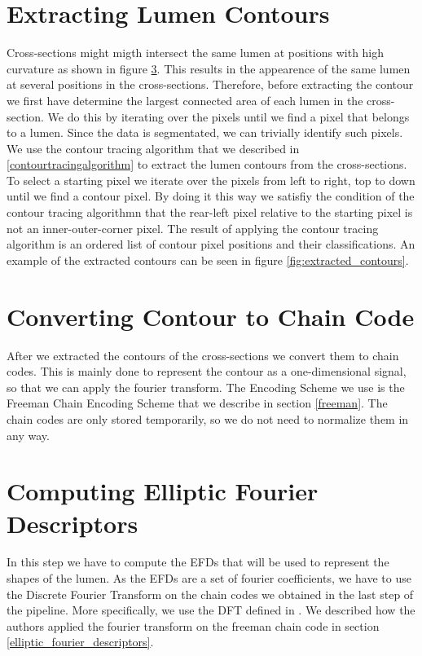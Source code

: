 \documentclass[thesis.tex]{subfiles}
\begin{document}
\section{Extracting Lumen Contours}
Cross-sections might migth intersect the same lumen at positions with high curvature as shown in figure \ref{}. This results in the appearence of the same lumen at several positions in the cross-sections. Therefore, before extracting the contour we first have determine the largest connected area of each lumen in the cross-section. We do this by iterating over the pixels until we find a pixel that belongs to a lumen. Since the data is segmentated, we can trivially identify such pixels. \\   

We use the contour tracing algorithm that we described in \ref{contourtracingalgorithm} to extract the lumen contours from the cross-sections. To select a starting pixel we iterate over the pixels from left to right, top to down until we find a contour pixel. By doing it this way we satisfiy the condition of the contour tracing algorithmn that the rear-left pixel relative to the starting pixel is not an inner-outer-corner pixel.
The result of applying the contour tracing algorithm is an ordered list of contour pixel positions and their classifications.
An example of the extracted contours can be seen in figure \ref{fig:extracted_contours}.

\section{Converting Contour to Chain Code}
After we extracted the contours of the cross-sections we convert them to chain codes. This is mainly done to represent the contour as a one-dimensional signal, so that we can apply the fourier transform. The Encoding Scheme we use is the Freeman Chain Encoding Scheme that we describe in section \ref{freeman}. The chain codes are only stored temporarily, so we do not need to normalize them in any way.

\section{Computing Elliptic Fourier Descriptors}
In this step we have to compute the EFDs that will be used to represent the shapes of the lumen. As the EFDs are a set of fourier coefficients, we have to use the Discrete Fourier Transform on the chain codes we obtained in the last step of the pipeline. More specifically, we use the DFT defined in \cite{giardinia}. We described how the authors applied the fourier transform on the freeman chain code in section \ref{elliptic_fourier_descriptors}. 
\end{document}
